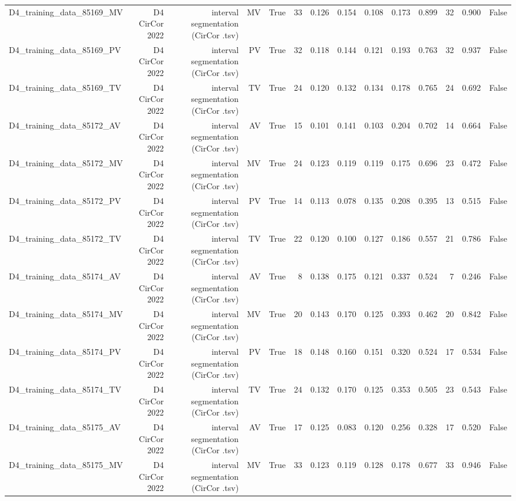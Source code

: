 \begin{table}[htbp]
\begin{tabular}{lrrrrrrrrrrrrr}
    D4\_training\_data\_85169\_MV & D4 CirCor 2022 & interval segmentation (CirCor .tsv) & MV & True & 33 & 0.126 & 0.154 & 0.108 & 0.173 & 0.899 & 32 & 0.900 & False \\
    D4\_training\_data\_85169\_PV & D4 CirCor 2022 & interval segmentation (CirCor .tsv) & PV & True & 32 & 0.118 & 0.144 & 0.121 & 0.193 & 0.763 & 32 & 0.937 & False \\
    D4\_training\_data\_85169\_TV & D4 CirCor 2022 & interval segmentation (CirCor .tsv) & TV & True & 24 & 0.120 & 0.132 & 0.134 & 0.178 & 0.765 & 24 & 0.692 & False \\
    D4\_training\_data\_85172\_AV & D4 CirCor 2022 & interval segmentation (CirCor .tsv) & AV & True & 15 & 0.101 & 0.141 & 0.103 & 0.204 & 0.702 & 14 & 0.664 & False \\
    D4\_training\_data\_85172\_MV & D4 CirCor 2022 & interval segmentation (CirCor .tsv) & MV & True & 24 & 0.123 & 0.119 & 0.119 & 0.175 & 0.696 & 23 & 0.472 & False \\
    D4\_training\_data\_85172\_PV & D4 CirCor 2022 & interval segmentation (CirCor .tsv) & PV & True & 14 & 0.113 & 0.078 & 0.135 & 0.208 & 0.395 & 13 & 0.515 & False \\
    D4\_training\_data\_85172\_TV & D4 CirCor 2022 & interval segmentation (CirCor .tsv) & TV & True & 22 & 0.120 & 0.100 & 0.127 & 0.186 & 0.557 & 21 & 0.786 & False \\
    D4\_training\_data\_85174\_AV & D4 CirCor 2022 & interval segmentation (CirCor .tsv) & AV & True & 8 & 0.138 & 0.175 & 0.121 & 0.337 & 0.524 & 7 & 0.246 & False \\
    D4\_training\_data\_85174\_MV & D4 CirCor 2022 & interval segmentation (CirCor .tsv) & MV & True & 20 & 0.143 & 0.170 & 0.125 & 0.393 & 0.462 & 20 & 0.842 & False \\
    D4\_training\_data\_85174\_PV & D4 CirCor 2022 & interval segmentation (CirCor .tsv) & PV & True & 18 & 0.148 & 0.160 & 0.151 & 0.320 & 0.524 & 17 & 0.534 & False \\
    D4\_training\_data\_85174\_TV & D4 CirCor 2022 & interval segmentation (CirCor .tsv) & TV & True & 24 & 0.132 & 0.170 & 0.125 & 0.353 & 0.505 & 23 & 0.543 & False \\
    D4\_training\_data\_85175\_AV & D4 CirCor 2022 & interval segmentation (CirCor .tsv) & AV & True & 17 & 0.125 & 0.083 & 0.120 & 0.256 & 0.328 & 17 & 0.520 & False \\
    D4\_training\_data\_85175\_MV & D4 CirCor 2022 & interval segmentation (CirCor .tsv) & MV & True & 33 & 0.123 & 0.119 & 0.128 & 0.178 & 0.677 & 33 & 0.946 & False \\

\end{tabular}
\end{table}
